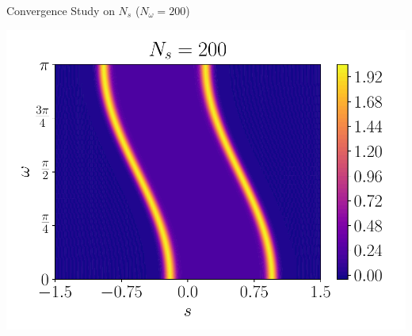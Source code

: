 \documentclass{beamer}
\begin{document}
\begin{frame}{Convergence Study on $N_s$ \quad ($N_\omega = 200$)}
{\begin{minipage}{0.38\linewidth}
		\end{minipage}
		\hspace{-0.25cm}
		\begin{minipage}{0.38\linewidth}
			\includegraphics[width=\linewidth]{figures/Radon_Solution_Nonsymmetric_200.pdf} 
		\end{minipage}
	}
\end{frame}
\end{document}
